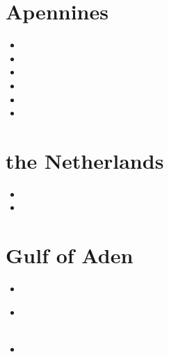 \section{Apennines}

\begin{scriptsize}
\begin{itemize}
\item[\nineteenninetyeight] 
\item[\twothousandseven] 
\item[\twothousandnine] 
\item[\twothousandfourteen] 
\item[\twothousandfifteen] 
\item[\twothousandtwenty] 
\end{itemize}
\end{scriptsize}

\section{the Netherlands}

\begin{scriptsize}
\begin{itemize}
\item[\twothousandtwo]  
\item[\twothousandtwenty]  
\end{itemize}
\end{scriptsize}

\section{Gulf of Aden}

\begin{scriptsize}
\begin{itemize}
\item[\twothousandthree] 
\item[\twothousandthirteen] 
  \\
  \\
\item[\twothousandtwenty] 
\end{itemize}
\end{scriptsize}


